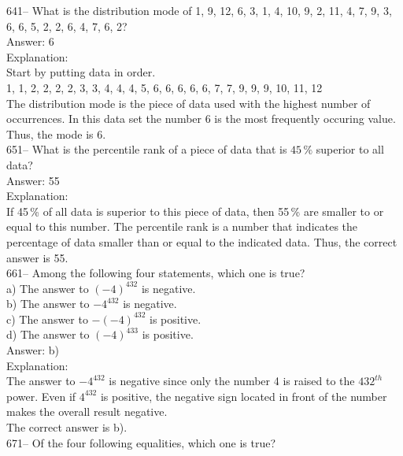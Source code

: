 \documentclass[letterpaper, 12pt]{article}
\begin{document}
641-- What is the distribution mode of 1, 9, 12, 6, 3, 1, 4, 10, 9, 2,
11, 4, 7, 9, 3, 6, 6, 5, 2, 2, 6, 4, 7, 6, 2?\\

Answer: 6\\

Explanation: \\
Start by putting data in order.\\
1, 1, 2, 2, 2, 2, 3, 3, 4, 4, 4, 5, 6, 6, 6, 6, 6, 7, 7, 9, 9, 9, 10, 11,
12\\
The distribution mode is the piece of data used with the highest number of occurrences. In this data set the number 6 is the most frequently occuring value. Thus, the mode is 6.\\

651-- What is the percentile rank of a piece of data that is $45\,\%$ superior to all data?\\

Answer: 55\\

Explanation: \\
If 45\,\% of all data is superior to this piece of data, then 55\,\% are smaller to or equal to this number. The percentile rank is a number that indicates the percentage of data smaller than or equal to the indicated data.  Thus, the correct answer is 55.\\

661-- Among the following four statements, which one is true?\\

a) The answer to $(-4)^{432}$ is negative.\\
b) The answer to $-4^{432}$ is negative.\\
c) The answer to $-(-4)^{432}$ is positive.\\
d) The answer to $(-4)^{433}$ is positive.\\

Answer: b)\\

Explanation: \\
The answer to $-4^{432}$ is negative since only the number 4 is raised to the $432^{th}$ power. Even if $4^{432}$ is positive, the negative sign located in front of the number makes the overall result negative.\\
The correct answer is b).\\

671-- Of the four following equalities, which one is true?\\
\end{document}
